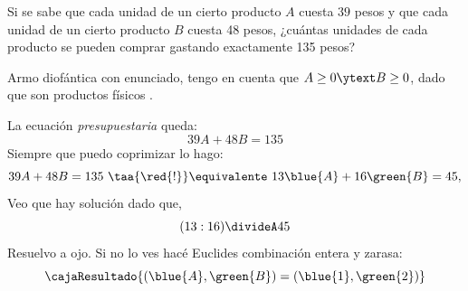 \begin{enunciado}{\ejercicio}
  Si se sabe que cada unidad de un cierto producto $A$ cuesta $39$ pesos y que cada unidad de un cierto
  producto $B$ cuesta 48 pesos, ¿cuántas unidades de cada producto se pueden comprar gastando exactamente
  135 pesos?
\end{enunciado}

Armo diofántica con enunciado, tengo en cuenta que
$A \geq 0 \ytext B \geq 0$, dado que son productos físicos .

La ecuación \textit{presupuestaria} queda:
$$
  39A + 48B = 135
$$
Siempre que puedo coprimizar lo hago:
$$
  39A + 48B = 135
  ~
  \taa{\red{!}}\equivalente
  ~
  13 \blue{A} + 16\green{B} = 45,
$$
Veo que hay solución dado que,
$$
  (13:16) \divideA 45
$$
Resuelvo a ojo. Si no lo ves hacé Euclides combinación entera y zarasa:
$$
  \cajaResultado{
    (\blue{A},\green{B}) = (\blue{1},\green{2})
  }
$$

\begin{aportes}[2]
  \item {}
  \item {}
\end{aportes}
